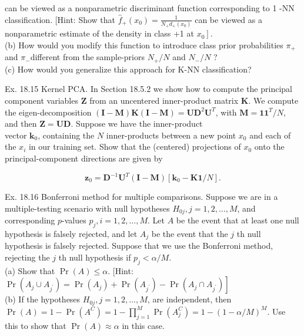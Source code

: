 \documentclass[10pt]{article}
\begin{document}
can be viewed as a nonparametric discriminant function corresponding to 1 -NN classification. [Hint: Show that $\hat{f}_{+}\left(x_{0}\right)=\frac{1}{N_{+} d_{+}\left(x_{0}\right)}$ can be viewed as a nonparametric estimate of the density in class +1 at $\left.x_{0}\right]$.\\
(b) How would you modify this function to introduce class prior probabilities $\pi_{+}$and $\pi_{-}$different from the sample-priors $N_{+} / N$ and $N_{-} / N$ ?\\
(c) How would you generalize this approach for K-NN classification?

Ex. 18.15 Kernel PCA. In Section 18.5.2 we show how to compute the principal component variables $\mathbf{Z}$ from an uncentered inner-product matrix $\mathbf{K}$. We compute the eigen-decomposition $(\mathbf{I}-\mathbf{M}) \mathbf{K}(\mathbf{I}-\mathbf{M})=\mathbf{U D}^{2} \mathbf{U}^{T}$, with $\mathbf{M}=\mathbf{1 1}^{T} / N$, and then $\mathbf{Z}=\mathbf{U D}$. Suppose we have the inner-product\\
vector $\mathbf{k}_{0}$, containing the $N$ inner-products between a new point $x_{0}$ and each of the $x_{i}$ in our training set. Show that the (centered) projections of $x_{0}$ onto the principal-component directions are given by


\begin{equation*}
\mathbf{z}_{0}=\mathbf{D}^{-1} \mathbf{U}^{T}(\mathbf{I}-\mathbf{M})\left[\mathbf{k}_{0}-\mathbf{K} \mathbf{1} / N\right] . \tag{18.58}
\end{equation*}


Ex. 18.16 Bonferroni method for multiple comparisons. Suppose we are in a multiple-testing scenario with null hypotheses $H_{0 j}, j=1,2, \ldots, M$, and corresponding $p$-values $p_{j}, i=1,2, \ldots, M$. Let $A$ be the event that at least one null hypothesis is falsely rejected, and let $A_{j}$ be the event that the $j$ th null hypothesis is falsely rejected. Suppose that we use the Bonferroni method, rejecting the $j$ th null hypothesis if $p_{j}<\alpha / M$.\\
(a) Show that $\operatorname{Pr}(A) \leq \alpha$. [Hint: $\operatorname{Pr}\left(A_{j} \cup A_{j^{\prime}}\right)=\operatorname{Pr}\left(A_{j}\right)+\operatorname{Pr}\left(A_{j^{\prime}}\right)- \left.\operatorname{Pr}\left(A_{j} \cap A_{j^{\prime}}\right)\right]$\\
(b) If the hypotheses $H_{0 j}, j=1,2, \ldots, M$, are independent, then $\operatorname{Pr}(A)= 1-\operatorname{Pr}\left(A^{C}\right)=1-\prod_{j=1}^{M} \operatorname{Pr}\left(A_{j}^{C}\right)=1-(1-\alpha / M)^{M}$. Use this to show that $\operatorname{Pr}(A) \approx \alpha$ in this case.
\end{document}

